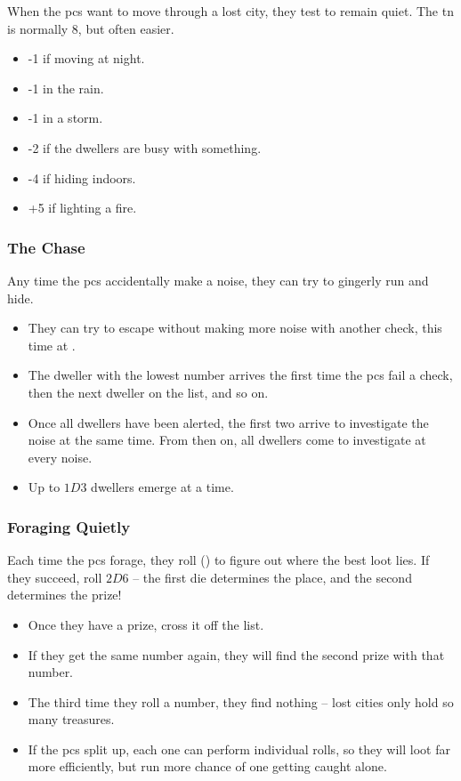 \begin{multicols}{2}
When the \glspl{pc} want to move through a lost city, they test  to remain quiet.
The \gls{tn} is normally 8, but often easier.

\begin{itemize}
  \item
  -1 if moving at night.
  \item
  -1 in the rain.
  \item
  -1 in a storm.
  \item
  -2 if the dwellers are busy with something.
  \item
  -4 if hiding indoors.
  \item
  +5 if lighting a fire.
\end{itemize}

\subsubsection{The Chase}
\label{lostChase}

Any time the \glspl{pc} accidentally make a noise, they can try to gingerly run and hide.

\begin{itemize}
  \item
  They can try to escape without making more noise with another  check, this time at \tn[10].
  \item
  The dweller with the lowest number arrives the first time the \glspl{pc} fail a check, then the next dweller on the list, and so on.
  \item
  Once all dwellers have been alerted, the first two arrive to investigate the noise at the same time.
  From then on, all dwellers come to investigate at every noise.
  \item
  Up to $1D3$ dwellers emerge at a time.
\end{itemize}

\subsubsection{Foraging Quietly}
\label{lostForaging}

Each time the \glspl{pc} forage, they roll  (\tn[12]) to figure out where the best loot lies.
If they succeed, roll $2D6$ -- the first die determines the place, and the second determines the prize!

\begin{itemize}
  \item
  Once they have a prize, cross it off the list.
  \item
  If they get the same number again, they will find the second prize with that number.
  \item
  The third time they roll a number, they find nothing -- lost cities only hold so many treasures.
  \item
  If the \glspl{pc} split up, each one can perform individual rolls, so they will loot far more efficiently, but run more chance of one getting caught alone.


\end{itemize}
\end{multicols}
